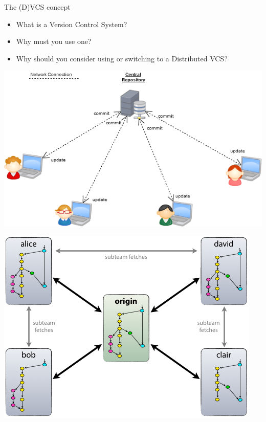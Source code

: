 \documentclass{beamer}
\begin{document}
\begin{frame}{The (D)VCS concept}
    \begin{itemize}
        \item What is a Version Control System?
        \pause
        \item Why must you use one?
        \pause
        \item Why should you consider using or switching to a Distributed VCS?
    \end{itemize}
    \begin{minipage}{0.4\textwidth}
    \begin{flushleft}
    \includegraphics[width=\textwidth]{VCS.png}
    \end{flushleft}
    \end{minipage}
    \hfill\vrule\hfill
    \begin{minipage}{0.4\textwidth}
    \begin{flushright}
    \includegraphics[width=\textwidth]{DVCS.png}

\end{flushright}
\end{minipage}
\end{frame}
\end{document}
